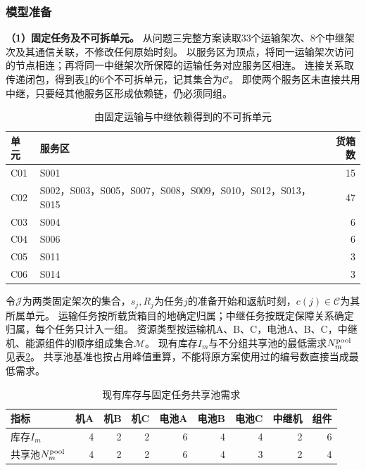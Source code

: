 \subsubsection{模型准备}
\label{sec:q4:preparation}

\textbf{（1）固定任务及不可拆单元。}
从问题三完整方案读取33个运输架次、8个中继架次及其通信关联，不修改任何原始时刻。
以服务区为顶点，将同一运输架次访问的节点相连；再将同一中继架次所保障的运输任务对应服务区相连。
连接关系取传递闭包，得到表\ref{tab:q4:atoms}的6个不可拆单元，记其集合为$\mathcal C$。
即使两个服务区未直接共用中继，只要经其他服务区形成依赖链，仍必须同组。

\begin{table}[htbp]
  \centering
  \caption{由固定运输与中继依赖得到的不可拆单元}
  \label{tab:q4:atoms}
  \begin{tabular}{lp{}r}
    \toprule
    单元 & 服务区 & 货箱数 \\
    \midrule
    C01 & S001 & 15 \\
    C02 & S002，S003，S005，S007，S008，S009，S010，S012，S013，S015 & 47 \\
    C03 & S004 & 6 \\
    C04 & S006 & 6 \\
    C05 & S011 & 3 \\
    C06 & S014 & 3 \\
    \bottomrule
  \end{tabular}
\end{table}

令$\mathcal J$为两类固定架次的集合，$s_j,R_j$为任务$j$的准备开始和返航时刻，$c(j)\in\mathcal C$为其所属单元。
运输任务按所载货箱目的地确定归属；中继任务按既定保障关系确定归属，每个任务只计入一组。
资源类型按运输机A、B、C，电池A、B、C，中继机、能源组件的顺序组成集合$\mathcal M$。
现有库存$I_m$与不分组共享池的最低需求$N_m^{\rm pool}$见表\ref{tab:q4:baseline}。
共享池基准也按占用峰值重算，不能将原方案使用过的编号数直接当成最低需求。

\begin{table}[htbp]
  \centering
  \caption{现有库存与固定任务共享池需求}
  \label{tab:q4:baseline}
  \begin{tabular}{lrrrrrrrr}
    \toprule
    指标 & 机A & 机B & 机C & 电池A & 电池B & 电池C & 中继机 & 组件 \\
    \midrule
    库存$I_m$ & 4 & 2 & 2 & 6 & 4 & 4 & 2 & 6 \\
    共享池$N_m^{\rm pool}$ & 4 & 2 & 2 & 6 & 4 & 3 & 2 & 4 \\
    \bottomrule
  \end{tabular}
\end{table}

